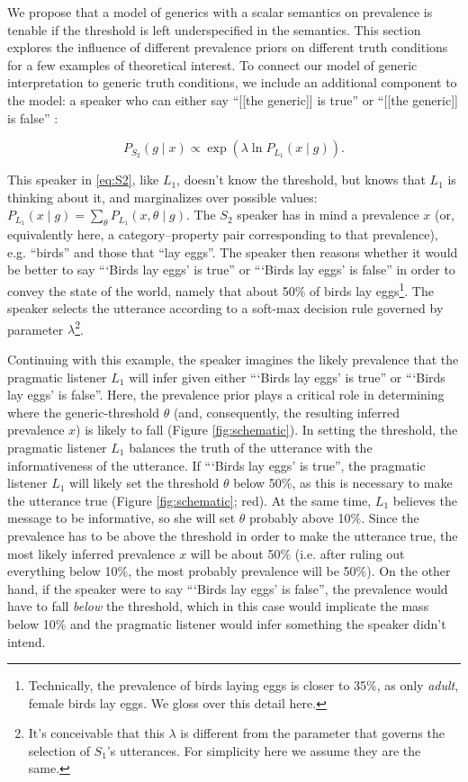 \documentclass[10pt,letterpaper]{article}
\begin{document}
We propose that a model of generics with a scalar semantics on prevalence is tenable if the threshold is left underspecified in the semantics. This section explores the influence of different prevalence priors on different truth conditions for a few examples of theoretical interest. To connect our model of generic interpretation to generic truth conditions, we include an additional component to the model: a speaker who can either say ``[[the generic]] is true'' or ``[[the generic]] is false'' \cite{Degen2014}:

\begin{equation} 
P_{S_{2}}(g \mid x) \propto \exp(\lambda \ln {P_{L_{1}}(x \mid g)}).
\label{eq:S2}
\end{equation}


This speaker in \eqref{eq:S2}, like $L_{1}$, doesn't know the threshold, but knows that $L_{1}$ is thinking about it, and marginalizes over possible values: $ P_{L_{1}}(x \mid g) = \sum_{\theta} P_{L_{1}}(x , \theta \mid g) $. The $S_{2}$ speaker has in mind a prevalence $x$ (or, equivalently here, a category--property pair corresponding to that prevalence), e.g. ``birds'' and those that ``lay eggs''. The speaker then reasons whether it would be better to say ```Birds lay eggs' is true''  or ```Birds lay eggs' is false'' in order to convey the state of the world, namely that about 50\% of birds lay eggs\footnote{Technically, the prevalence of birds laying eggs is closer to 35\%, as only \emph{adult}, female birds lay eggs. We gloss over this detail here.}. The speaker selects the utterance according to a soft-max decision rule governed by parameter $\lambda$\footnote{It's conceivable that this $\lambda$ is different from the parameter that governs the selection of $S_{1}$'s utterances. For simplicity here we assume they are the same.}.

Continuing with this example, the speaker imagines the likely prevalence that the pragmatic listener $L_{1}$ will infer given either ```Birds lay eggs' is true''  or ```Birds lay eggs' is false''. Here, the prevalence prior plays a critical role in determining where the generic-threshold $\theta$ (and, consequently, the resulting inferred prevalence $x$) is likely to fall (Figure \ref{fig:schematic}). In setting the threshold, the pragmatic listener $L_{1}$ balances the truth of the utterance with the informativeness of the utterance. If ```Birds lay eggs' is true'', the pragmatic listener $L_{1}$ will likely set the threshold $\theta$ below 50\%, as this is necessary to make the utterance true (Figure \ref{fig:schematic}; red). At the same time, $L_{1}$ believes the message to be informative, so she will set $\theta$ probably above 10\%. Since the prevalence has to be above the threshold in order to make the utterance true, the most likely inferred prevalence $x$ will be about 50\% (i.e. after ruling out everything below 10\%, the most probably prevalence will be 50\%). On the other hand, if the speaker were to say ```Birds lay eggs' is false'', the prevalence would have to fall \emph{below} the threshold, which in this case would implicate the mass below 10\% and the pragmatic listener would infer something the speaker didn't intend. 
\end{document}
